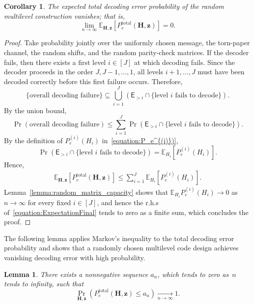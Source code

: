 \documentclass[journal,letterpaper,onecolumn,11pt]{IEEEtran}
\newcommand{\boldz}{\mathbf{z}}
\newcommand{\boldH}{\mathbf{H}}
\newtheorem{lemma}{Lemma}
\newtheorem{corollary}{Corollary}
\begin{document}
\begin{corollary}\label{corollary:total_decoding_error}
The expected total decoding error probability of the random multilevel
construction vanishes; that is,
\[
\lim_{n\to\infty}
\mathbb E_{\boldH,\boldz}
\left[
P_e^{\mathrm{total}}(\boldH,\boldz)
\right]
=
0.
\]
\end{corollary}

\begin{proof}
Take probability jointly over the uniformly chosen message, the torn-paper channel, the random shifts, and the random parity-check matrices.
If the decoder fails, then there exists a first
level \(i\in[J]\) at which decoding fails.  Since the decoder proceeds in
the order \(J,J-1,\ldots,1\), all levels \(i+1,\ldots,J\) must have
been decoded correctly before this first failure occurs.  Therefore,
\[
\{\text{overall decoding failure}\}
\subseteq
\bigcup_{i=1}^{J}
\left(
\mathsf E_{>i}
\cap
\{\text{level \(i\) fails to decode}\}
\right).
\]
By the union bound,
\[
\Pr(\text{overall decoding failure})
\leq
\sum_{i=1}^{J}
\Pr\left(
\mathsf E_{>i}
\cap
\{\text{level \(i\) fails to decode}\}
\right).
\]
By the definition of \(P_e^{(i)}(H_i)\) in~\eqref{equation:P_e^{(i)})},
\[
\Pr\left(
\mathsf E_{>i}
\cap
\{\text{level \(i\) fails to decode}\}
\right)
=
\mathbb E_{H_i}\!\left[P_e^{(i)}(H_i)\right].
\]
Hence,
\begin{align}\label{equation:ExpectationFinal}
\mathbb E_{\boldH,\boldz}
\left[
P_e^{\mathrm{total}}(\boldH,\boldz)
\right]
\leq
\sum_{i=1}^{J}
\mathbb E_{H_i}\!\left[P_e^{(i)}(H_i)\right].
\end{align}
Lemma~\ref{lemma:random_matrix_capacity} shows that $\mathbb E_{H_i}\!P_e^{(i)}(H_i)\to0$ as~$n\to\infty$ for every fixed
\(i\in[J]\), and hence the r.h.s of~\eqref{equation:ExpectationFinal} tends to zero as a finite sum, which concludes the proof.
\end{proof}

The following lemma applies Markov's inequality to the total decoding
error probability and shows that a randomly chosen multilevel code design
achieves vanishing decoding error with high probability.

\begin{lemma}\label{lemma:high_probability_existence}
There exists a nonnegative sequence $a_n$, which tends to zero as~$n$ tends to infinity, such that
\[
\Pr_{\boldH,\boldz}\left(
P_e^{\mathrm{total}}(\boldH,\boldz)\leq a_n
\right)
\xrightarrow[n\to\infty]{}1.
\]
\end{lemma}
\end{document}
